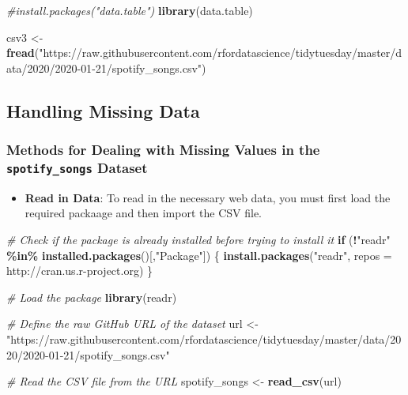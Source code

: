 \documentclass[
]{book}
\newenvironment{Shaded}{\begin{snugshade}}{\end{snugshade}}
\newcommand{\AttributeTok}[1]{\textcolor[rgb]{0.13,0.29,0.53}{#1}}
\newcommand{\CommentTok}[1]{\textcolor[rgb]{0.56,0.35,0.01}{\textit{#1}}}
\newcommand{\ControlFlowTok}[1]{\textcolor[rgb]{0.13,0.29,0.53}{\textbf{#1}}}
\newcommand{\FunctionTok}[1]{\textcolor[rgb]{0.13,0.29,0.53}{\textbf{#1}}}
\newcommand{\NormalTok}[1]{#1}
\newcommand{\OtherTok}[1]{\textcolor[rgb]{0.56,0.35,0.01}{#1}}
\newcommand{\SpecialCharTok}[1]{\textcolor[rgb]{0.81,0.36,0.00}{\textbf{#1}}}
\newcommand{\StringTok}[1]{\textcolor[rgb]{0.31,0.60,0.02}{#1}}
\providecommand{\tightlist}{%
  \setlength{\itemsep}{0pt}\setlength{\parskip}{0pt}}
\begin{document}
\begin{Shaded}
\begin{Highlighting}[]
\CommentTok{\#install.packages("data.table")}
\FunctionTok{library}\NormalTok{(data.table)}

\NormalTok{csv3 }\OtherTok{\textless{}{-}} \FunctionTok{fread}\NormalTok{(}\StringTok{"https://raw.githubusercontent.com/rfordatascience/tidytuesday/master/data/2020/2020{-}01{-}21/spotify\_songs.csv"}\NormalTok{)}
\end{Highlighting}
\end{Shaded}

\hypertarget{handling-missing-data}{%
\subsection*{Handling Missing Data}\label{handling-missing-data}}

\hypertarget{methods-for-dealing-with-missing-values-in-the-spotify_songs-dataset}{%
\subsubsection*{\texorpdfstring{Methods for Dealing with Missing Values in the \texttt{spotify\_songs} Dataset}{Methods for Dealing with Missing Values in the spotify\_songs Dataset}}\label{methods-for-dealing-with-missing-values-in-the-spotify_songs-dataset}}

\begin{itemize}
\tightlist
\item
  \textbf{Read in Data}: To read in the necessary web data, you must first load the required packaage and then import the CSV file.
\end{itemize}

\begin{Shaded}
\begin{Highlighting}[]
\CommentTok{\# Check if the package is already installed before trying to install it}
\ControlFlowTok{if}\NormalTok{ (}\SpecialCharTok{!}\StringTok{"readr"} \SpecialCharTok{\%in\%} \FunctionTok{installed.packages}\NormalTok{()[,}\StringTok{"Package"}\NormalTok{]) \{}
  \FunctionTok{install.packages}\NormalTok{(}\StringTok{"readr"}\NormalTok{, }\AttributeTok{repos =} \StringTok{\textquotesingle{}http://cran.us.r{-}project.org\textquotesingle{}}\NormalTok{)}
\NormalTok{\}}

\CommentTok{\# Load the package}
\FunctionTok{library}\NormalTok{(readr)}

\CommentTok{\# Define the raw GitHub URL of the dataset}
\NormalTok{url }\OtherTok{\textless{}{-}} \StringTok{"https://raw.githubusercontent.com/rfordatascience/tidytuesday/master/data/2020/2020{-}01{-}21/spotify\_songs.csv"}

\CommentTok{\# Read the CSV file from the URL}
\NormalTok{spotify\_songs }\OtherTok{\textless{}{-}} \FunctionTok{read\_csv}\NormalTok{(url)}
\end{Highlighting}
\end{Shaded}
\end{document}
